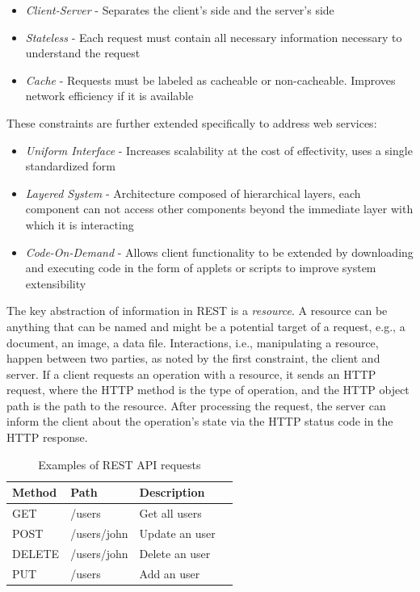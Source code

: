 \begin{itemize}
    \item \textit{Client-Server} - Separates the client's side and the server's side
    \item \textit{Stateless} - Each request must contain all necessary information necessary to understand the request
    \item \textit{Cache} - Requests must be labeled as cacheable or non-cacheable. Improves network efficiency if it is available
\end{itemize}

These constraints are further extended specifically to address web services:
\begin{itemize}
    \item \textit{Uniform Interface} - Increases scalability at the cost of effectivity, uses a single standardized form
    \item \textit{Layered System} - Architecture composed of hierarchical layers, each component can not access other components beyond the immediate layer with which it is interacting
    \item \textit{Code-On-Demand} - Allows client functionality to be extended by downloading and executing code in the form of applets or scripts to improve system extensibility
\end{itemize}

The key abstraction of information in REST is a \textit{resource}. A resource can be anything that can be named and might be a potential target of a request, e.g., a document, an image, a data file. Interactions, i.e., manipulating a resource, happen between two parties, as noted by the first constraint, the client and server. If a client requests an operation with a resource, it sends an HTTP request, where the HTTP method is the type of operation, and the HTTP object path is the path to the resource. After processing the request, the server can inform the client about the operation's state via the HTTP status code in the HTTP response.\cite{RestAPI}

\begin{table}[hbt]
\centering
\label{restapiex}
\begin{tabular}{|l|l|l|l|}
\hline
\textbf{Method} & \textbf{Path} & \textbf{Description} \\ \hline
 GET & /users & Get all users \\ \hline
 POST & /users/john & Update an user  \\ \hline
 DELETE & /users/john &  Delete an user \\ \hline
 PUT & /users & Add an user \\ \hline
\end{tabular}
\caption{Examples of REST API requests}
\end{table} 

